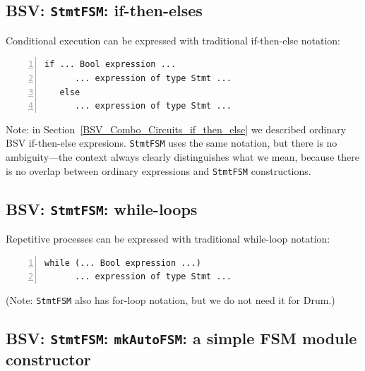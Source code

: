 
\subsection{BSV: {\tt StmtFSM}: if-then-elses}


Conditional execution can be expressed with traditional if-then-else notation:
\begin{Verbatim}[frame=single, numbers=left]
   if ... Bool expression ...
      ... expression of type Stmt ...
   else
      ... expression of type Stmt ...
\end{Verbatim}

Note: in Section~\ref{BSV_Combo_Circuits_if_then_else} we described
ordinary BSV if-then-else expresions.  \verb|StmtFSM| uses the same
notation, but there is no ambiguity---the context always clearly
distinguishes what we mean, because there is no overlap between
ordinary expressions and \verb|StmtFSM| constructions.


\subsection{BSV: {\tt StmtFSM}: while-loops}


Repetitive processes can be expressed with traditional while-loop notation:
\begin{Verbatim}[frame=single, numbers=left]
   while (... Bool expression ...)
      ... expression of type Stmt ...
\end{Verbatim}

(Note: \verb|StmtFSM| also has for-loop notation, but we do not need it for Drum.)


\subsection{BSV: {\tt StmtFSM}: {\tt mkAutoFSM}: a simple FSM module constructor}


